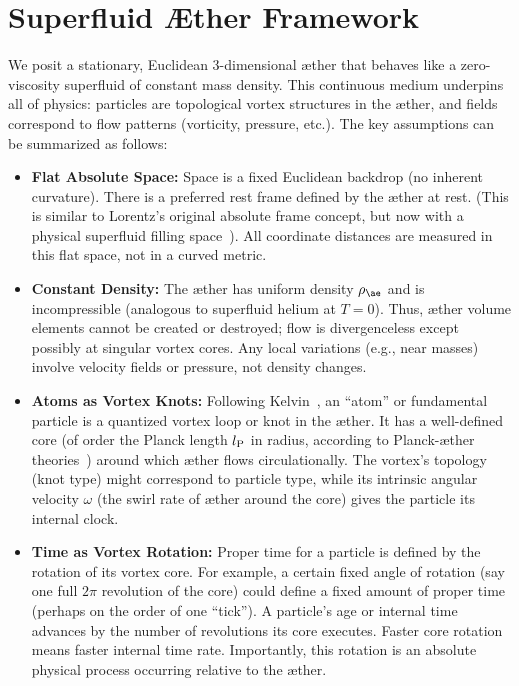
\section{Superfluid Æther Framework}

We posit a stationary, Euclidean 3-dimensional æther that behaves like a zero-viscosity superfluid of constant mass density. This continuous medium underpins all of physics: particles are topological vortex structures in the æther, and fields correspond to flow patterns (vorticity, pressure, etc.). The key assumptions can be summarized as follows:

\begin{itemize}
    \item \textbf{Flat Absolute Space:} Space is a fixed Euclidean backdrop (no inherent curvature). There is a preferred rest frame defined by the æther at rest. (This is similar to Lorentz’s original absolute frame concept, but now with a physical superfluid filling space~\cite{Winterberg2002-PlanckAether}). All coordinate distances are measured in this flat space, not in a curved metric.

    \item \textbf{Constant Density:} The æther has uniform density $\rho_{\ae}$ and is incompressible (analogous to superfluid helium at $T=0$). Thus, æther volume elements cannot be created or destroyed; flow is divergenceless except possibly at singular vortex cores. Any local variations (e.g., near masses) involve velocity fields or pressure, not density changes.

    \item \textbf{Atoms as Vortex Knots:} Following Kelvin~\cite{Kelvin1867-vortex}, an “atom” or fundamental particle is a quantized vortex loop or knot in the æther. It has a well-defined core (of order the Planck length $l_{\rm P}$ in radius, according to Planck-æther theories~\cite{Winterberg2002-PlanckAether}) around which æther flows circulationally. The vortex’s topology (knot type) might correspond to particle type, while its intrinsic angular velocity $\omega$ (the swirl rate of æther around the core) gives the particle its internal clock.

    \item \textbf{Time as Vortex Rotation:} Proper time for a particle is defined by the rotation of its vortex core. For example, a certain fixed angle of rotation (say one full $2\pi$ revolution of the core) could define a fixed amount of proper time (perhaps on the order of one “tick”). A particle’s age or internal time advances by the number of revolutions its core executes. Faster core rotation means faster internal time rate. Importantly, this rotation is an absolute physical process occurring relative to the æther.


\end{itemize}
